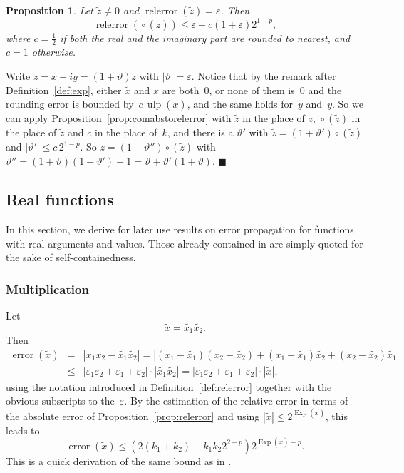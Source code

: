 \documentclass [11pt]{article}
\newcommand {\corr}[1]{{#1}}
\newcommand {\appro}[1]{\widetilde {#1}}
\newcommand {\Ulp}{{\operatorname {ulp}}}
\DeclareMathOperator{\Exp}{\operatorname {Exp}}
\newcommand{\error}{\operatorname {error}}
\newcommand{\relerror}{\operatorname {relerror}}
\newcommand {\round}{\operatorname {\circ}}
\renewcommand {\epsilon}{\varepsilon}
\renewcommand {\theta}{\vartheta}
\renewcommand {\leq}{\leqslant}
\newtheorem{prop}[theorem]{Proposition}
\newenvironment{proof}{\noindent{\bf Proof:}}{{\hspace* {\fill}$\blacksquare$}}
\begin{document}
\begin {prop}
\label {prop:comrelround}
Let $\appro z \neq 0$ and $\relerror (\appro z) = \epsilon$.
Then
\[
\relerror (\round (\appro z)) \leq
\epsilon + c (1 + \epsilon) 2^{1-p},
\]
where $c = \frac {1}{2}$ if both the real and the imaginary part are
rounded to nearest, and $c = 1$ otherwise.
\end {prop}

\begin {proof}
Write $\corr z = \corr x + i \corr y = (1 + \theta) \appro z$
with $|\theta| = \epsilon$.
Notice that by the remark after Definition~\ref {def:exp}, either
$\appro x$ and $\corr x$ are both~$0$, or none of them is~$0$ and the
rounding error is bounded by~$c \, \Ulp (\appro x)$, and the same holds
for~$\appro y$ and~$\corr y$.
So we can apply
Proposition~\ref {prop:comabstorelerror} with $\appro z$ in the
place of $\corr z$, $\round (\appro z)$ in the place of $\appro z$
and $c$ in the place of~$k$, and
there is a $\theta'$ with $\appro z = (1 + \theta') \round (\appro z)$
and $|\theta'| \leq c \, 2^{1-p}$.
So $\corr z = (1 + \theta'') \round (\appro z)$ with
$\theta'' = (1 + \theta)(1 + \theta') - 1
= \theta + \theta' (1 + \theta)$.
\end {proof}


\subsection {Real functions}

In this section, we derive for later use results on error propagation for
functions with real arguments and values. Those already contained in
\cite{MPFRAlgorithms} are simply quoted for the sake of self-containedness.


\subsubsection {Multiplication}
\label {sssec:proprealmul}

Let
\[
\appro x = \appro {x_1} \appro {x_2}.
\]
Then
\begin {eqnarray*}
\error (\appro x)
& = & \left| \corr {x_1} \corr {x_2} - \appro {x_1} \appro {x_2} \right|
= \left|   (\corr {x_1} - \appro {x_1}) (\corr {x_2} - \appro {x_2})
         + (\corr {x_1} - \appro {x_1}) \appro {x_2}
         + (\corr {x_2} - \appro {x_2}) \appro {x_1}
         \right| \\
& \leq & |\epsilon_1 \epsilon_2 + \epsilon_1 + \epsilon_2|
      \cdot \left| \appro {x_1} \appro {x_2} \right|
= |\epsilon_1 \epsilon_2 + \epsilon_1 + \epsilon_2| \cdot |\appro x|,
\end {eqnarray*}
using the notation introduced in Definition~\ref {def:relerror} together
with the obvious subscripts to the~$\epsilon$.
By the estimation of the relative error in terms of the absolute error of
Proposition~\ref {prop:relerror} and using
$|\appro x| \leq 2^{\Exp (\appro x)}$, this leads to
\begin {equation}
\label {eq:proprealmul}
\error (\appro x)
\leq \left( 2 (k_1 + k_2) + k_1 k_2 2^{2-p} \right)
   2^{\Exp (\appro x) - p}.
\end {equation}
This is a quick derivation of the same bound as in
\cite[\S2.4]{MPFRAlgorithms}.
\end{document}
